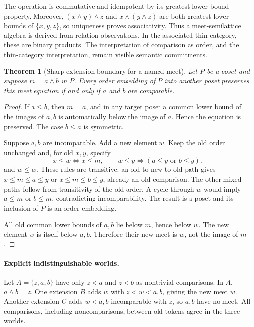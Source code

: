 \documentclass[11pt]{article}
\newtheorem{theorem}{Theorem}[section]
\theoremstyle{remark}
\begin{document}
The operation is commutative and idempotent by its greatest-lower-bound property. Moreover, $(x\wedge y)\wedge z$ and $x\wedge(y\wedge z)$ are both greatest lower bounds of $\{x,y,z\}$, so uniqueness proves associativity. Thus a meet-semilattice algebra is derived from relation observations. In the associated thin category, these are binary products. The interpretation of comparison as order, and the thin-category interpretation, remain visible semantic commitments.

\begin{theorem}[Sharp extension boundary for a named meet]
\label{thm:meet}
Let $P$ be a poset and suppose $m=a\wedge b$ in $P$. Every order embedding of $P$ into another poset preserves this meet equation if and only if $a$ and $b$ are comparable.
\end{theorem}
\begin{proof}
If $a\le b$, then $m=a$, and in any target poset a common lower bound of the images of $a,b$ is automatically below the image of $a$. Hence the equation is preserved. The case $b\le a$ is symmetric.

Suppose $a,b$ are incomparable. Add a new element $w$. Keep the old order unchanged and, for old $x,y$, specify
\[
 x\le w\Longleftrightarrow x\le m,
 \qquad
 w\le y\Longleftrightarrow (a\le y\text{ or }b\le y),
\]
and $w\le w$. These rules are transitive: an old-to-new-to-old path gives $x\le m\le a\le y$ or $x\le m\le b\le y$, already an old comparison. The other mixed paths follow from transitivity of the old order. A cycle through $w$ would imply $a\le m$ or $b\le m$, contradicting incomparability. The result is a poset and its inclusion of $P$ is an order embedding.

All old common lower bounds of $a,b$ lie below $m$, hence below $w$. The new element $w$ is itself below $a,b$. Therefore their new meet is $w$, not the image of $m$.
\end{proof}

\paragraph{Explicit indistinguishable worlds.}
Let $A=\{z,a,b\}$ have only $z<a$ and $z<b$ as nontrivial comparisons. In $A$, $a\wedge b=z$. One extension $B$ adds $w$ with $z<w<a,b$, giving the new meet $w$. Another extension $C$ adds $w<a,b$ incomparable with $z$, so $a,b$ have no meet. All comparisons, including noncomparisons, between old tokens agree in the three worlds.
\end{document}
